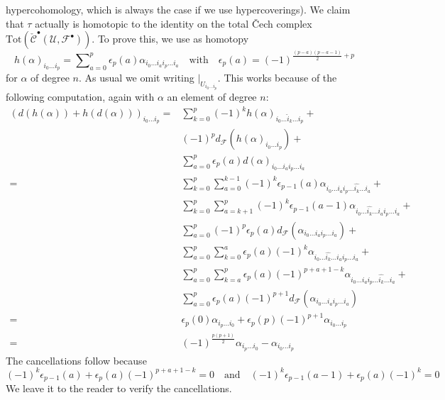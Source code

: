 hypercohomology, which is always the case if we use hypercoverings).
We claim that $\tau$ actually is homotopic to the identity on the
total {\v C}ech complex
$\text{Tot}(\check{\mathcal{C}}^\bullet({\mathcal U}, {\mathcal F}^\bullet))$.
To prove this, we use as homotopy
$$
h(\alpha)_{i_0 \ldots i_p}
=
\sum\nolimits_{a = 0}^p
\epsilon_p(a)
\alpha_{i_0 \ldots i_a i_p \ldots i_a}
\quad\text{with}\quad
\epsilon_p(a) = (-1)^{\frac{(p - a)(p - a - 1)}{2} + p}
$$
for $\alpha$ of degree $n$. As usual we omit writing
$|_{U_{i_0 \ldots i_p}}$. This works
because of the following computation, again with
$\alpha$ an element of degree $n$:
\begin{align*}
(d(h(\alpha)) + h(d(\alpha)))_{i_0 \ldots i_p}
= &
\sum\nolimits_{k = 0}^p
(-1)^k
h(\alpha)_{i_0 \ldots \hat i_k \ldots i_p}
+ \\
&
(-1)^p
d_{\mathcal F}(h(\alpha)_{i_0 \ldots i_p})
+ \\
&
\sum\nolimits_{a = 0}^p
\epsilon_p(a)
d(\alpha)_{i_0 \ldots i_a i_p \ldots i_a}
\\
= &
\sum\nolimits_{k = 0}^p
\sum\nolimits_{a = 0}^{k - 1}
(-1)^k \epsilon_{p - 1}(a)
\alpha_{i_0 \ldots i_a i_p \ldots \hat{i_k} \ldots i_a}
+ \\
&
\sum\nolimits_{k = 0}^p
\sum\nolimits_{a = k + 1}^p
(-1)^k \epsilon_{p - 1}(a - 1)
\alpha_{i_0 \ldots \hat{i_k} \ldots i_a i_p \ldots i_a}
+ \\
&
\sum\nolimits_{a = 0}^p
(-1)^p \epsilon_p(a)
d_{\mathcal F}(\alpha_{i_0 \ldots i_a i_p \ldots i_a})
+ \\
&
\sum\nolimits_{a = 0}^p
\sum\nolimits_{k = 0}^a
\epsilon_p(a) (-1)^k
\alpha_{i_0 \ldots \hat{i_k} \ldots i_a i_p \ldots i_a}
+ \\
&
\sum\nolimits_{a = 0}^p
\sum\nolimits_{k = a}^p
\epsilon_p(a) (-1)^{p + a + 1 - k}
\alpha_{i_0 \ldots i_a i_p \ldots \hat{i_k} \ldots i_a}
+ \\
&
\sum\nolimits_{a = 0}^p
\epsilon_p(a) (-1)^{p + 1}
d_{\mathcal F}(\alpha_{i_0 \ldots i_a i_p \ldots i_a})
\\
= &
\epsilon_p(0) \alpha_{i_p \ldots i_0} +
\epsilon_p(p) (-1)^{p + 1} \alpha_{i_0 \ldots i_p} \\
= &
(-1)^{\frac{p(p + 1)}{2}}\alpha_{i_p \ldots i_0}
- \alpha_{i_0 \ldots i_p}
\end{align*}
The cancellations follow because
$$
(-1)^k \epsilon_{p - 1}(a) + \epsilon_p(a)(-1)^{p + a + 1 - k} = 0
\quad\text{and}\quad
(-1)^k\epsilon_{p - 1}(a - 1) + \epsilon_p(a) (-1)^k = 0
$$
We leave it to the reader to verify the cancellations.

